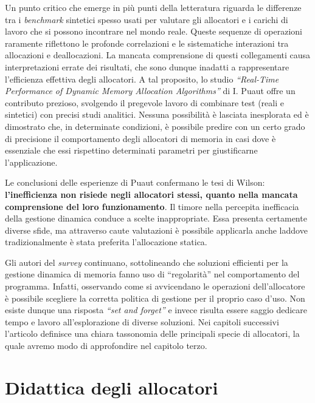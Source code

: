 Un punto critico che emerge in più punti della letteratura riguarda le differenze tra i \textit{benchmark} sintetici spesso usati per valutare gli allocatori e i carichi di lavoro che si possono incontrare nel mondo reale. Queste sequenze di operazioni raramente riflettono le profonde correlazioni e le sistematiche interazioni tra allocazioni e deallocazioni. La mancata comprensione di questi collegamenti causa interpretazioni errate dei risultati, che sono dunque inadatti a rappresentare l’efficienza effettiva degli allocatori. A tal proposito, lo studio \textit{``Real-Time Performance of Dynamic Memory Allocation Algorithms''} di I. Puaut\cite{puaut2002} offre un contributo prezioso, svolgendo il pregevole lavoro di combinare test (reali e sintetici) con precisi studi analitici. Nessuna possibilità è lasciata inesplorata ed è dimostrato che, in determinate condizioni, è possibile predire con un certo grado di precisione il comportamento degli allocatori di memoria in casi dove è essenziale che essi rispettino determinati parametri per giustificarne l’applicazione.

Le conclusioni delle esperienze di Puaut confermano le tesi di Wilson: \textbf{l’inefficienza non risiede negli allocatori stessi, quanto nella mancata comprensione del loro funzionamento}. Il timore nella percepita inefficacia della gestione dinamica conduce a scelte inappropriate. Essa presenta certamente diverse sfide, ma attraverso caute valutazioni è possibile applicarla anche laddove tradizionalmente è stata preferita l’allocazione statica.

Gli autori del \textit{survey} continuano, sottolineando che soluzioni efficienti per la gestione dinamica di memoria fanno uso di ``regolarità'' nel comportamento del programma. Infatti, osservando come si avvicendano le operazioni dell'allocatore è possibile scegliere la corretta politica di gestione per il proprio caso d’uso. Non esiste dunque una risposta \textit{``set and forget''} e invece risulta essere saggio dedicare tempo e lavoro all’esplorazione di diverse soluzioni. Nei capitoli successivi l’articolo definisce una chiara tassonomia delle principali specie di allocatori, la quale avremo modo di approfondire nel capitolo terzo.

\section{Didattica degli allocatori}


